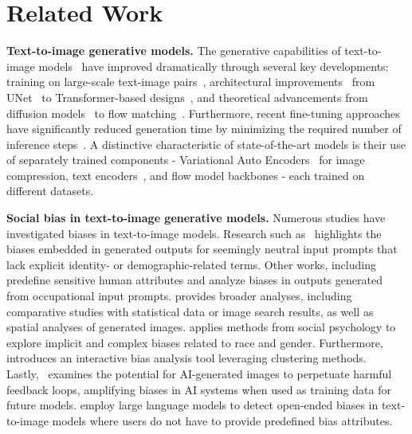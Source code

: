\section{Related Work}
\label{sec:related_works}
\noindent \textbf{Text-to-image generative models.} The generative capabilities of text-to-image models~\cite{imagen3,sd3,chen2025pixart} have improved dramatically through several key developments: training on large-scale text-image pairs~\cite{schuhmann2022laion,Chen_2023}, architectural improvements~\cite{peebles2023scalable} from UNet~\cite{ronneberger2015u} to Transformer-based designs~\cite{AttentionAllYouNeed,Dosovitskiy_2020}, and theoretical advancements from diffusion models~\cite{sohl2015deep,ddpm,Song_2020} to flow matching~\cite{Lipman_2022,Xingchao_2022,lipman2024flowmatchingguidecode}. Furthermore, recent fine-tuning approaches have significantly reduced generation time by minimizing the required number of inference steps~\cite{liu2023instaflow,chen2024pixartdeltafastcontrollableimage,sauer2024fast,Sauer_2023,Yang_2023}. A distinctive characteristic of state-of-the-art models is their use of separately trained components - Variational Auto Encoders~\cite{kingma_2014} for image compression, text encoders~\cite{raffel2020exploring,clip}, and flow model backbones - each trained on different datasets.

\noindent \textbf{Social bias in text-to-image generative models.} Numerous studies have investigated biases in text-to-image models. Research such as~\cite{Ghosh_2023,Wu_2023,bianchi2023easily} highlights the biases embedded in generated outputs for seemingly neutral input prompts that lack explicit identity- or demographic-related terms. Other works, including~\cite{Cho_2022,Luccioni_2023} predefine sensitive human attributes and analyze biases in outputs generated from occupational input prompts. \cite{naik2023social} provides broader analyses, including comparative studies with statistical data or image search results, as well as spatial analyses of generated images. \cite{Wang_2023} applies methods from social psychology to explore implicit and complex biases related to race and gender. Furthermore,~\cite{Luccioni_2023} introduces an interactive bias analysis tool leveraging clustering methods. Lastly,~\cite{Chen_2024} examines the potential for AI-generated images to perpetuate harmful feedback loops, amplifying biases in AI systems when used as training data for future models. \cite{D'Incà_2024,Chinchure_2023} employ large language models to detect open-ended biases in text-to-image models where users do not have to provide predefined bias attributes.

